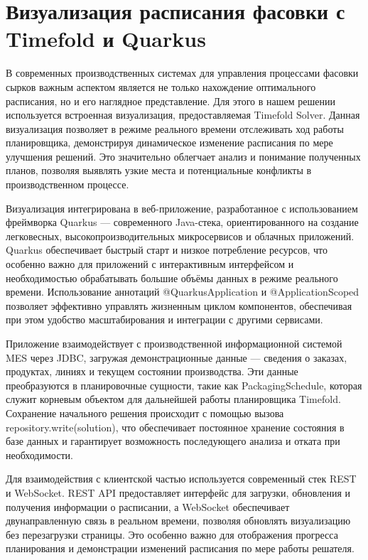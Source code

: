 \section{Визуализация расписания фасовки с Timefold и Quarkus}

В современных производственных системах для управления процессами фасовки сырков важным аспектом является не только нахождение оптимального расписания, но и его наглядное представление. Для этого в нашем решении используется встроенная визуализация, предоставляемая Timefold Solver. Данная визуализация позволяет в режиме реального времени отслеживать ход работы планировщика, демонстрируя динамическое изменение расписания по мере улучшения решений. Это значительно облегчает анализ и понимание полученных планов, позволяя выявлять узкие места и потенциальные конфликты в производственном процессе.

Визуализация интегрирована в веб-приложение, разработанное с использованием фреймворка Quarkus — современного Java-стека, ориентированного на создание легковесных, высокопроизводительных микросервисов и облачных приложений. Quarkus обеспечивает быстрый старт и низкое потребление ресурсов, что особенно важно для приложений с интерактивным интерфейсом и необходимостью обрабатывать большие объёмы данных в режиме реального времени. Использование аннотаций @QuarkusApplication и @ApplicationScoped позволяет эффективно управлять жизненным циклом компонентов, обеспечивая при этом удобство масштабирования и интеграции с другими сервисами.

Приложение взаимодействует с производственной информационной системой MES через JDBC, загружая демонстрационные данные — сведения о заказах, продуктах, линиях и текущем состоянии производства. Эти данные преобразуются в планировочные сущности, такие как PackagingSchedule, которая служит корневым объектом для дальнейшей работы планировщика Timefold. Сохранение начального решения происходит с помощью вызова repository.write(solution), что обеспечивает постоянное хранение состояния в базе данных и гарантирует возможность последующего анализа и отката при необходимости.

Для взаимодействия с клиентской частью используется современный стек REST и WebSocket. REST API предоставляет интерфейс для загрузки, обновления и получения информации о расписании, а WebSocket обеспечивает двунаправленную связь в реальном времени, позволяя обновлять визуализацию без перезагрузки страницы. Это особенно важно для отображения прогресса планирования и демонстрации изменений расписания по мере работы решателя.

